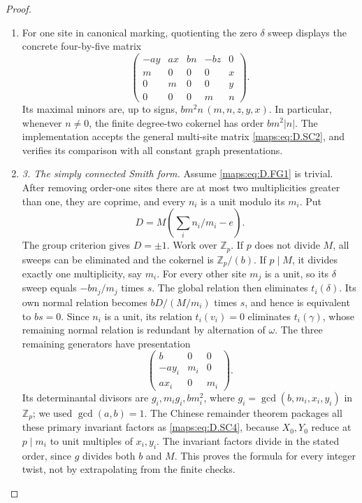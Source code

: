 \begin{proof}
\begin{enumerate}[label=\arabic*.,leftmargin=*]
\item For one site in canonical marking, quotienting the zero $\delta$
sweep displays the concrete four-by-five matrix
\[
 \begin{pmatrix}
 -ay&ax&bn&-bz&0\\
 m&0&0&0&x\\0&m&0&0&y\\0&0&0&m&n
 \end{pmatrix}.                                             \tag{D.SC7}\label{maps:eq:D.SC7}
\]
Its maximal minors are, up to signs,
$bm^2n\,(m,n,z,y,x)$. In particular, whenever $n\ne0$,
the finite degree-two cokernel has order $bm^2|n|$.
The implementation accepts the general multi-site matrix \eqref{maps:eq:D.SC2},
and verifies its comparison with all constant graph presentations.

\item \emph{3. The simply connected Smith form.}
Assume \eqref{maps:eq:D.FG1} is trivial. After removing order-one sites there are
at most two multiplicities greater than one, they are coprime, and
every $n_i$ is a unit modulo its $m_i$. Put
\[
                  D=M\left(\sum_i n_i/m_i-e\right).
\]
The group criterion gives $D=\pm1$. Work over $\mathbb Z_p$.
If $p$ does not divide $M$, all sweeps can be eliminated and the
cokernel is $\mathbb Z_p/(b)$. If $p\mid M$, it divides exactly
one multiplicity, say $m_i$. For every other site $m_j$ is a unit,
so its $\delta$ sweep equals $-bn_j/m_j$ times $s$. The global
relation then eliminates $t_i(\delta)$. Its own normal relation
becomes $bD/(M/m_i)$ times $s$, and hence is equivalent to $bs=0$.
Since $n_i$ is a unit, its relation $t_i(v_i)=0$ eliminates
$t_i(\gamma)$, whose remaining normal relation is redundant by
alternation of $\omega$. The three remaining generators have
presentation
\[
 \begin{pmatrix}
 b&0&0\\ -ay_i&m_i&0\\ ax_i&0&m_i
 \end{pmatrix}.                                             \tag{D.SC8}\label{maps:eq:D.SC8}
\]
Its determinantal divisors are $g_i,m_i g_i,bm_i^2$, where
$g_i=\gcd(b,m_i,x_i,y_i)$ in $\mathbb Z_p$; we used
$\gcd(a,b)=1$. The Chinese remainder theorem packages all these
primary invariant factors as \eqref{maps:eq:D.SC4}, because
$X_0,Y_0$ reduce at $p\mid m_i$ to unit multiples of $x_i,y_i$.
The invariant factors divide in the stated order, since $g$ divides
both $b$ and $M$. This proves the formula for every integer twist,
not by extrapolating from the finite checks.


\end{enumerate}
\end{proof}

